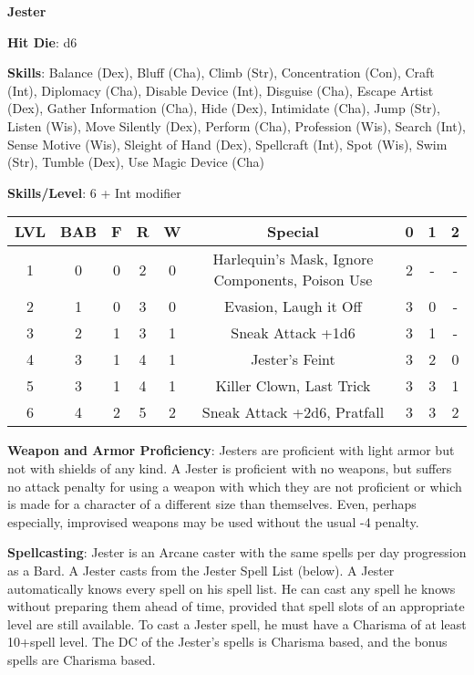 \textbf{\huge{Jester}}

\textbf{Hit Die}: d6

\textbf{Skills}: Balance (Dex), Bluff (Cha), Climb (Str), Concentration (Con), Craft (Int), Diplomacy (Cha), Disable Device (Int), Disguise (Cha), Escape Artist (Dex), Gather Information (Cha), Hide (Dex), Intimidate (Cha), Jump (Str), Listen (Wis), Move Silently (Dex), Perform (Cha), Profession (Wis), Search (Int), Sense Motive (Wis), Sleight of Hand (Dex), Spellcraft (Int), Spot (Wis), Swim (Str), Tumble (Dex), Use Magic Device (Cha)

\textbf{Skills/Level}: 6 + Int modifier

\begin{center}
\begin{adjustwidth}{-4cm}{}
\begin{small}
\begin{tabular}{| c | c | c | c | c | c | c | c | c |}
\hline
LVL &BAB &F &R &W &Special &0 &1 &2 \\
\hline
1 &0 &0 &2 &0 &Harlequin's Mask, Ignore Components, Poison Use &2 &- &- \\
2 &1 &0 &3 &0 &Evasion, Laugh it Off &3 &0 &- \\
3 &2 &1 &3 &1 &Sneak Attack +1d6 &3 &1 &- \\
4 &3 &1 &4 &1 &Jester's Feint &3 &2 &0 \\
5 &3 &1 &4 &1 &Killer Clown, Last Trick &3 &3 &1 \\
6 &4 &2 &5 &2 &Sneak Attack +2d6, Pratfall &3 &3 &2 \\
\hline
\end{tabular}
\end{small}
\end{adjustwidth}
\end{center}

\textbf{Weapon and Armor Proficiency}: Jesters are proficient with light armor but not with shields of any kind. A Jester is proficient with no weapons, but suffers no attack penalty for using a weapon with which they are not proficient or which is made for a character of a different size than themselves. Even, perhaps especially, improvised weapons may be used without the usual -4 penalty.

\textbf{Spellcasting}: Jester is an Arcane caster with the same spells per day progression as a Bard. A Jester casts from the Jester Spell List (below). A Jester automatically knows every spell on his spell list. He can cast any spell he knows without preparing them ahead of time, provided that spell slots of an appropriate level are still available. To cast a Jester spell, he must have a Charisma of at least 10+spell level. The DC of the Jester’s spells is Charisma based, and the bonus spells are Charisma based.

